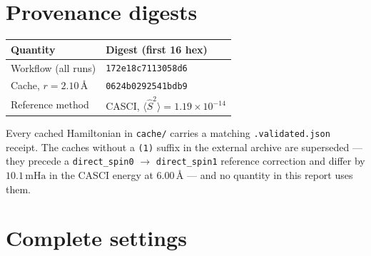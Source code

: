 \documentclass[11pt,a4paper]{article}
\newcommand{\mHa}{\ensuremath{\,\mathrm{mHa}}}
\newcommand{\Ang}{\ensuremath{\,\text{\AA}}}
\newcommand{\Ssq}{\ensuremath{\langle \hat{S}^2 \rangle}}
\newcommand{\code}[1]{\texttt{\small #1}}
\begin{document}
\appendix

\section{Provenance digests}

\begin{center}
\small
\begin{tabular}{ll}
\toprule
Quantity & Digest (first 16 hex) \\
\midrule
Workflow (all runs)            & \code{172e18c7113058d6} \\
Cache, $r = 2.10\Ang$          & \code{0624b0292541bdb9} \\
Reference method               & CASCI, $\Ssq = 1.19\times10^{-14}$ \\
\bottomrule
\end{tabular}
\end{center}

Every cached Hamiltonian in \code{cache/} carries a matching
\code{.validated.json} receipt. The caches without a \code{(1)} suffix in the
external archive are superseded --- they precede a
\code{direct\_spin0} $\to$ \code{direct\_spin1} reference correction and differ
by $10.1\mHa$ in the CASCI energy at $6.00\Ang$ --- and no quantity in this
report uses them.

\section{Complete settings}
\end{document}
